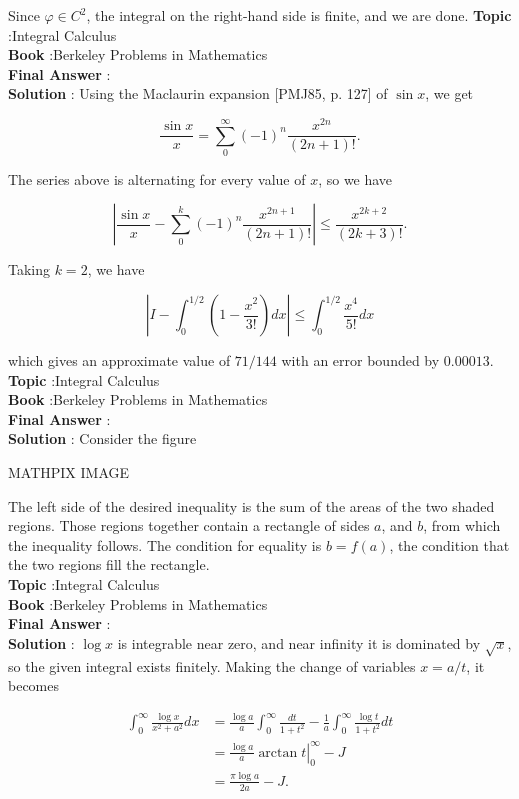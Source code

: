 \documentclass[10pt]{article}
\begin{document}
Since $\varphi \in C^{2}$, the integral on the right-hand side is finite, and we are done.
\textbf{Topic} :Integral Calculus \\
\textbf{Book} :Berkeley Problems in Mathematics\\
\textbf{Final Answer} :\\


\textbf{Solution} : Using the Maclaurin expansion [PMJ85, p. 127] of $\sin x$, we get

$$
\frac{\sin x}{x}=\sum_{0}^{\infty}(-1)^{n} \frac{x^{2 n}}{(2 n+1) !} .
$$

The series above is alternating for every value of $x$, so we have

$$
\left|\frac{\sin x}{x}-\sum_{0}^{k}(-1)^{n} \frac{x^{2 n+1}}{(2 n+1) !}\right| \leqslant \frac{x^{2 k+2}}{(2 k+3) !} .
$$

Taking $k=2$, we have

$$
\left|I-\int_{0}^{1 / 2}\left(1-\frac{x^{2}}{3 !}\right) d x\right| \leqslant \int_{0}^{1 / 2} \frac{x^{4}}{5 !} d x
$$

which gives an approximate value of $71 / 144$ with an error bounded by $0.00013$.
\textbf{Topic} :Integral Calculus \\
\textbf{Book} :Berkeley Problems in Mathematics\\
\textbf{Final Answer} :\\


\textbf{Solution} : Consider the figure

MATHPIX IMAGE

The left side of the desired inequality is the sum of the areas of the two shaded regions. Those regions together contain a rectangle of sides $a$, and $b$, from which the inequality follows. The condition for equality is $b=f(a)$, the condition that the two regions fill the rectangle. \\
\textbf{Topic} :Integral Calculus \\
\textbf{Book} :Berkeley Problems in Mathematics\\
\textbf{Final Answer} :\\


\textbf{Solution} : $\log x$ is integrable near zero, and near infinity it is dominated by $\sqrt{x}$, so the given integral exists finitely. Making the change of variables $x=a / t$, it becomes 

$$
\begin{aligned}
\int_{0}^{\infty} \frac{\log x}{x^{2}+a^{2}} d x &=\frac{\log a}{a} \int_{0}^{\infty} \frac{d t}{1+t^{2}}-\frac{1}{a} \int_{0}^{\infty} \frac{\log t}{1+t^{2}} d t \\
&=\left.\frac{\log a}{a} \arctan t\right|_{0} ^{\infty}-J \\
&=\frac{\pi \log a}{2 a}-J .
\end{aligned}
$$
\end{document}
